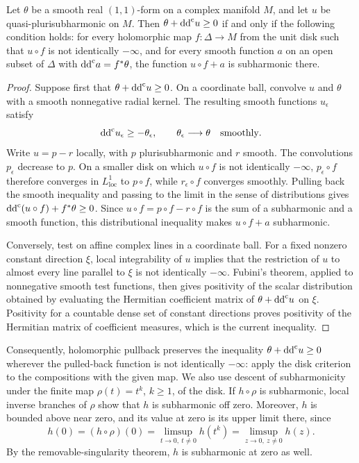 \begin{lemma}\label{lem:smooth-disk-criterion}
Let $\theta$ be a smooth real $(1,1)$-form on a complex manifold $M$, and let $u$ be quasi-plurisubharmonic on $M$. Then $\theta+\mathrm{dd}^{\mathrm{c}} u\geq0$ if and only if the following condition holds: for every holomorphic map $f\colon\Delta\to M$ from the unit disk such that $u\circ f$ is not identically $-\infty$, and for every smooth function $a$ on an open subset of $\Delta$ with $\mathrm{dd}^{\mathrm{c}} a=f^*\theta$, the function $u\circ f+a$ is subharmonic there.
\end{lemma}
\begin{proof}
Suppose first that $\theta+\mathrm{dd}^{\mathrm{c}} u\geq0$. On a coordinate ball, convolve $u$ and $\theta$ with a smooth nonnegative radial kernel. The resulting smooth functions $u_\epsilon$ satisfy
\[
 \mathrm{dd}^{\mathrm{c}} u_\epsilon\geq-\theta_\epsilon,
 \qquad\theta_\epsilon\longrightarrow\theta\quad\text{smoothly}.
\]
Write $u=p-r$ locally, with $p$ plurisubharmonic and $r$ smooth. The convolutions $p_\epsilon$ decrease to $p$. On a smaller disk on which $u\circ f$ is not identically $-\infty$, $p_\epsilon\circ f$ therefore converges in $L^1_{\mathrm{loc}}$ to $p\circ f$, while $r_\epsilon\circ f$ converges smoothly. Pulling back the smooth inequality and passing to the limit in the sense of distributions gives $\mathrm{dd}^{\mathrm{c}}(u\circ f)+f^*\theta\geq0$. Since $u\circ f=p\circ f-r\circ f$ is the sum of a subharmonic and a smooth function, this distributional inequality makes $u\circ f+a$ subharmonic.

Conversely, test on affine complex lines in a coordinate ball. For a fixed nonzero constant direction $\xi$, local integrability of $u$ implies that the restriction of $u$ to almost every line parallel to $\xi$ is not identically $-\infty$. Fubini's theorem, applied to nonnegative smooth test functions, then gives positivity of the scalar distribution obtained by evaluating the Hermitian coefficient matrix of $\theta+\mathrm{dd}^{\mathrm{c}} u$ on $\xi$. Positivity for a countable dense set of constant directions proves positivity of the Hermitian matrix of coefficient measures, which is the current inequality.
\end{proof}

Consequently, holomorphic pullback preserves the inequality $\theta+\mathrm{dd}^{\mathrm{c}} u\geq0$ wherever the pulled-back function is not identically $-\infty$: apply the disk criterion to the compositions with the given map. We also use descent of subharmonicity under the finite map $\rho(t)=t^k$, $k\geq1$, of the disk. If $h\circ\rho$ is subharmonic, local inverse branches of $\rho$ show that $h$ is subharmonic off zero. Moreover, $h$ is bounded above near zero, and its value at zero is its upper limit there, since
\[
 h(0)=(h\circ\rho)(0)
      =\limsup_{t\to0,\ t\ne0}h(t^k)
      =\limsup_{z\to0,\ z\ne0}h(z).
\]
By the removable-singularity theorem, $h$ is subharmonic at zero as well.

